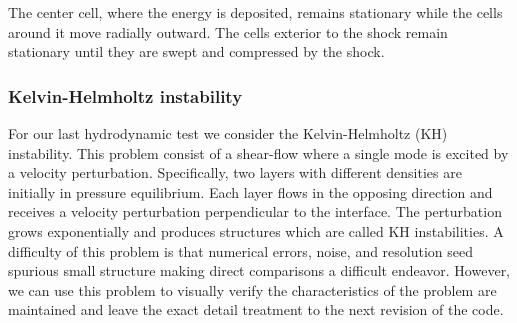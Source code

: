 The center cell, where the energy is deposited, remains stationary while the
cells around it move radially outward. The cells exterior to the shock remain
stationary until they are swept and compressed by the shock.

\subsubsection{Kelvin-Helmholtz instability}
For our last hydrodynamic test we consider the Kelvin-Helmholtz (KH) instability. This
problem consist of a shear-flow where a single mode is excited by a velocity perturbation.
Specifically, two layers with different densities are initially in pressure equilibrium. 
Each layer flows in the opposing direction and receives a velocity perturbation perpendicular
to the interface. The perturbation grows exponentially and produces structures which
are called KH instabilities. A difficulty of this problem is that
numerical errors, noise, and resolution seed spurious small structure \citep{Lecoanet2016}
making direct comparisons a difficult endeavor. However, we can use this problem to
visually verify the characteristics of the problem are maintained
and leave the exact detail treatment to the next revision of the code.

